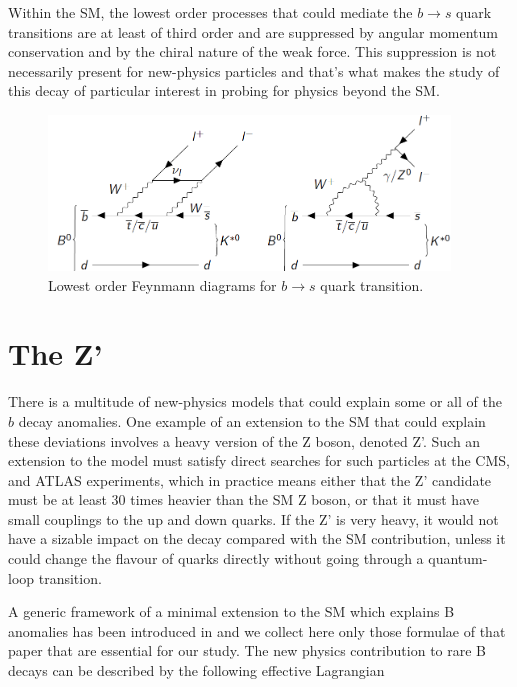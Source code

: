 Within the SM, the lowest order processes that could mediate the $b\rightarrow s$ quark transitions are at least of third order and are suppressed by angular momentum conservation and by the chiral nature of the weak force. This suppression is not necessarily present for new-physics particles and that's what makes the study of this decay of particular interest in probing for physics beyond the SM.

 \begin{figure}[H]
 	\centering
 	\includegraphics[width=0.95\textwidth]{figures/bmeson.png}
 	\singlespace
 	\caption{Lowest order Feynmann diagrams for $b\rightarrow s$ quark transition.}
 	\label{fig:bmesonpic}
 \end{figure}

\section{The Z'}
There is a multitude of new-physics models that could explain some or all of the $b$ decay anomalies. One example of an extension to the SM that could explain these deviations involves a heavy version of the Z boson, denoted Z'\cite{Buras:2013}. Such an extension to the model must satisfy direct searches for such particles at the CMS\cite{201757}, \cite{Sirunyan:2018exx} and ATLAS \cite{ATLAS-CONF-2016-045} experiments, which in practice means either that the Z' candidate must be at least 30 times heavier than the SM Z boson, or that it must have small couplings to the up and down quarks. If the Z' is very heavy, it would not have a sizable impact on the decay compared with the SM contribution, unless it could change the flavour of quarks directly without going through a quantum-loop transition.

A generic framework of a minimal extension to the SM which explains B anomalies has been introduced in \cite{Dalchenko:2017shg} and we collect here only those formulae of that paper that are essential for our study. The new physics contribution to rare B decays can be described by the following effective Lagrangian 

